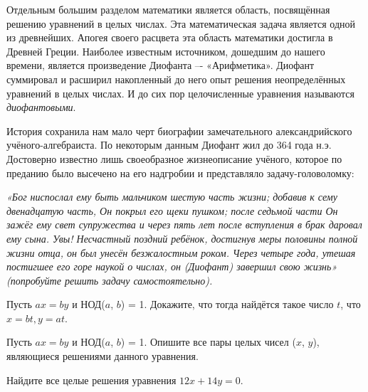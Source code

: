 Отдельным большим разделом математики является область, посвящённая решению уравнений в целых числах. Эта математическая задача является одной из древнейших. Апогея своего расцвета эта область математики достигла в Древней Греции. Наиболее известным источником, дошедшим до нашего времени, является произведение Диофанта –- «Арифметика». Диофант суммировал и расширил накопленный до него опыт решения неопределённых уравнений в целых числах. И до сих пор целочисленные уравнения называются \textit{диофантовыми}.
\par
История сохранила нам мало черт биографии замечательного александрийского учёного-алгебраиста. По некоторым данным Диофант жил до 364 года н.э. Достоверно известно лишь своеобразное жизнеописание учёного, которое по преданию было высечено на его надгробии и представляло задачу-головоломку:

\textit{«Бог ниспослал ему быть мальчиком шестую часть жизни; добавив к сему двенадцатую часть, Он покрыл его щеки пушком; после седьмой части Он зажёг ему свет супружества и через пять лет после вступления в брак даровал ему сына. Увы! Несчастный поздний ребёнок, достигнув меры половины полной жизни отца, он был унесён безжалостным роком. Через четыре года, утешая постигшее его горе наукой о числах, он (Диофант) завершил свою жизнь» (попробуйте решить задачу самостоятельно).}

\begin{ex}
    Пусть $ax = by$ и НОД($a$, $b$) = 1. Докажите, что тогда найдётся такое число $t$, что $x = bt, y = at$.
\end{ex}

\begin{ex}
    Пусть $ax = by$ и НОД($a$, $b$) = 1. Опишите все пары целых чисел ($x$, $y$), являющиеся решениями данного уравнения.
\end{ex}

\begin{ex}
    Найдите все целые решения уравнения $12x + 14y = 0$.
\end{ex}

